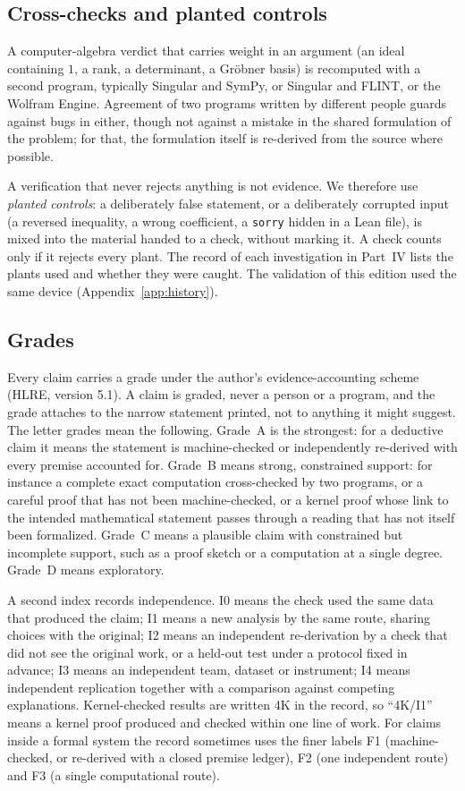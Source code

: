 \documentclass[a4paper,11pt]{article}
\theoremstyle{jsplain}
\theoremstyle{jsdef}
\theoremstyle{jsrem}
\begin{document}
\subsection{Cross-checks and planted controls}

A computer-algebra verdict that carries weight in an argument (an ideal containing $1$, a rank, a determinant, a Gr\"obner basis) is recomputed with a second program, typically Singular and SymPy, or Singular and FLINT, or the Wolfram Engine. Agreement of two programs written by different people guards against bugs in either, though not against a mistake in the shared formulation of the problem; for that, the formulation itself is re-derived from the source where possible.

A verification that never rejects anything is not evidence. We therefore use \emph{planted controls}: a deliberately false statement, or a deliberately corrupted input (a reversed inequality, a wrong coefficient, a \texttt{sorry} hidden in a Lean file), is mixed into the material handed to a check, without marking it. A check counts only if it rejects every plant. The record of each investigation in Part~IV lists the plants used and whether they were caught. The validation of this edition used the same device (Appendix~\ref{app:history}).

\subsection{Grades}

Every claim carries a grade under the author's evidence-accounting scheme (HLRE, version 5.1). A claim is graded, never a person or a program, and the grade attaches to the narrow statement printed, not to anything it might suggest. The letter grades mean the following. Grade~A is the strongest: for a deductive claim it means the statement is machine-checked or independently re-derived with every premise accounted for. Grade~B means strong, constrained support: for instance a complete exact computation cross-checked by two programs, or a careful proof that has not been machine-checked, or a kernel proof whose link to the intended mathematical statement passes through a reading that has not itself been formalized. Grade~C means a plausible claim with constrained but incomplete support, such as a proof sketch or a computation at a single degree. Grade~D means exploratory.

A second index records independence. I0 means the check used the same data that produced the claim; I1 means a new analysis by the same route, sharing choices with the original; I2 means an independent re-derivation by a check that did not see the original work, or a held-out test under a protocol fixed in advance; I3 means an independent team, dataset or instrument; I4 means independent replication together with a comparison against competing explanations. Kernel-checked results are written 4K in the record, so ``4K/I1'' means a kernel proof produced and checked within one line of work. For claims inside a formal system the record sometimes uses the finer labels F1 (machine-checked, or re-derived with a closed premise ledger), F2 (one independent route) and F3 (a single computational route).
\end{document}
